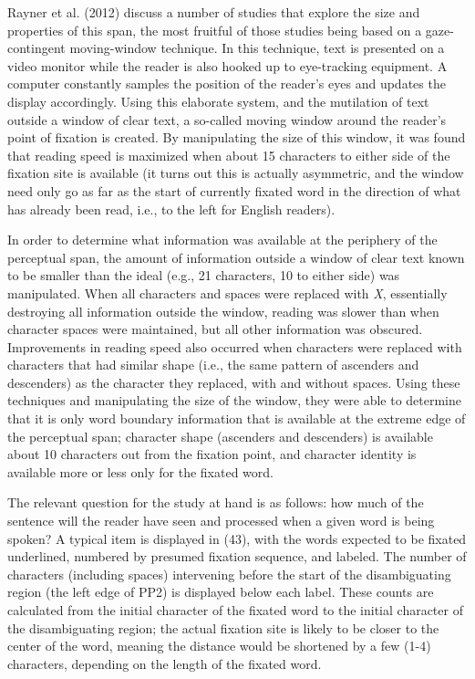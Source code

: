 \documentclass[12pt,oneside]{book}
\begin{document}
Rayner et al. (2012) discuss a number of studies that explore the size and properties of this span, the most fruitful of those studies being based on a gaze-contingent moving-window technique. In this technique, text is presented on a video monitor while the reader is also hooked up to eye-tracking equipment. A computer constantly samples the position of the reader's eyes and updates the display accordingly. Using this elaborate system, and the mutilation of text outside a window of clear text, a so-called moving window around the reader's point of fixation is created. By manipulating the size of this window, it was found that reading speed is maximized when about 15 characters to either side of the fixation site is available (it turns out this is actually asymmetric, and the window need only go as far as the start of currently fixated word in the direction of what has already been read, i.e., to the left for English readers).

In order to determine what information was available at the periphery of the perceptual span, the amount of information outside a window of clear text known to be smaller than the ideal (e.g., 21 characters, 10 to either side) was manipulated. When all characters and spaces were replaced with \emph{X}, essentially destroying all information outside the window, reading was slower than when character spaces were maintained, but all other information was obscured. Improvements in reading speed also occurred when characters were replaced with characters that had similar shape (i.e., the same pattern of ascenders and descenders) as the character they replaced, with and without spaces. Using these techniques and manipulating the size of the window, they were able to determine that it is only word boundary information that is available at the extreme edge of the perceptual span; character shape (ascenders and descenders) is available about 10 characters out from the fixation point, and character identity is available more or less only for the fixated word.

The relevant question for the study at hand is as follows: how much of the sentence will the reader have seen and processed when a given word is being spoken? A typical item is displayed in (43), with the words expected to be fixated underlined, numbered by presumed fixation sequence, and labeled. The number of characters (including spaces) intervening before the start of the disambiguating region (the left edge of PP2) is displayed below each label. These counts are calculated from the initial character of the fixated word to the initial character of the disambiguating region; the actual fixation site is likely to be closer to the center of the word, meaning the distance would be shortened by a few (1-4) characters, depending on the length of the fixated word.
\end{document}
